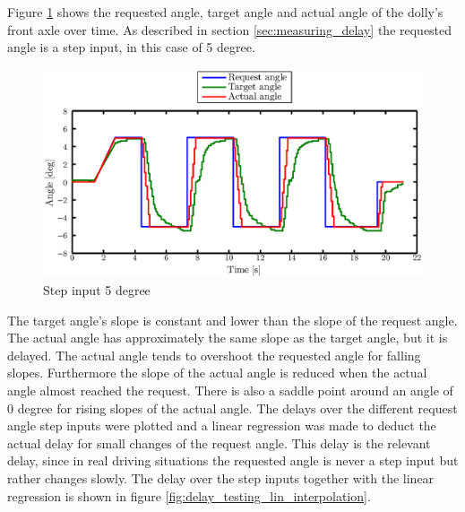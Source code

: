 \documentclass[ExampleMasters.tex]{subfiles}
\begin{document}
Figure \ref{fig:step_input} shows the requested angle, target angle and actual angle of the dolly's front axle over time. As described in section \ref{sec:measuring_delay} the requested angle is a step input, in this case of 5 degree.\\
\begin{figure}[!hbt]
	\centering
	\includegraphics[width=1\linewidth]{figures/lifted_front_5deg}
	\caption{Step input 5 degree}
	
	\label{fig:step_input}
\end{figure}
The target angle's slope is constant and lower than the slope of the request angle. The actual angle has approximately the same slope as the target angle, but it is delayed. The actual angle tends to overshoot the requested angle for falling slopes. Furthermore the slope of the actual angle is reduced when the actual angle almost reached the request. There is also a saddle point around an angle of 0 degree for rising slopes of the actual angle.          
The delays over the different request angle step inputs were plotted and a linear regression was made to deduct the actual delay for small changes of the request angle. This delay is the relevant delay, since in real driving situations the requested angle is never a step input but rather changes slowly. The delay over the step inputs together with the linear regression is shown in figure \ref{fig:delay_testing_lin_interpolation}.    
\end{document}
